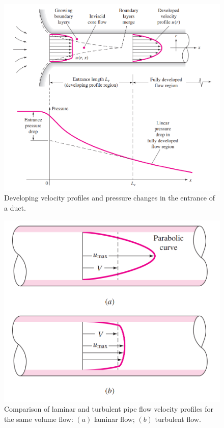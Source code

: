\documentclass[11pt]{article} %
\numberwithin{equation}{section} %
\begin{document}
\begin{figure}[!htb] %
\centering
\includegraphics[scale=0.46]{developing_velocity_profile}
\caption{Developing velocity profiles and pressure changes in the entrance of a duct.}
\label{fig:developing-velocity-profile}
\end{figure}
\begin{figure}[!htb]
\centering
\includegraphics[scale=0.35]{comparing_velocity_profiles}
\caption{Comparison of laminar and turbulent pipe flow velocity profiles for the same volume flow: $(a)$ laminar flow; $(b)$ turbulent flow.}
\label{fig:comparing-velocity-profiles}
\end{figure}
\end{document}
